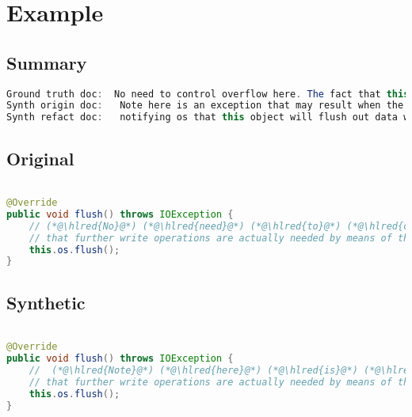 \documentclass[11pt]{article}
\DeclareRobustCommand{\hlred}[1]{{\sethlcolor{YellowOrange}\hl{#1}}}
\begin{document}
\pagebreak
\section{Example}
\subsection{Summary}

\begin{lstlisting}[language=java]
Ground truth doc:  No need to control overflow here. The fact that this has overflow will be used as a flag to determine
Synth origin doc:   Note here is an exception that may result when the implementation checks whether and if the operation succeeds to
Synth refact doc:   notifying os that this object will flush out data without notice and informing that we can detect when
\end{lstlisting}

\subsection{Original}
\begin{lstlisting}[language=java]

@Override
public void flush() throws IOException {
    // (*@\hlred{No}@*) (*@\hlred{need}@*) (*@\hlred{to}@*) (*@\hlred{control}@*) (*@\hlred{overflow}@*) (*@\hlred{here.}@*) (*@\hlred{The}@*) (*@\hlred{fact}@*) (*@\hlred{that}@*) (*@\hlred{this}@*) (*@\hlred{has}@*) (*@\hlred{overflow}@*) (*@\hlred{will}@*) (*@\hlred{be}@*) (*@\hlred{used}@*) (*@\hlred{as}@*) (*@\hlred{a}@*) (*@\hlred{flag}@*) to(*@\hlred{ determine}@*)
    // that further write operations are actually needed by means of the isOverflown() method.
    this.os.flush();
}
\end{lstlisting}
\subsection{Synthetic}

\begin{lstlisting}[language=java]

@Override
public void flush() throws IOException {
    //  (*@\hlred{Note}@*) (*@\hlred{here}@*) (*@\hlred{is}@*) (*@\hlred{an}@*) (*@\hlred{exception}@*) (*@\hlred{that}@*) (*@\hlred{may}@*) (*@\hlred{result}@*) (*@\hlred{when}@*) (*@\hlred{the}@*) (*@\hlred{implementation}@*) (*@\hlred{checks}@*) (*@\hlred{whether}@*) (*@\hlred{and}@*) (*@\hlred{if}@*) (*@\hlred{the}@*) (*@\hlred{operation}@*) (*@\hlred{succeeds}@*) to
    // that further write operations are actually needed by means of the isOverflown() method.
    this.os.flush();
}
\end{lstlisting}
\end{document}
